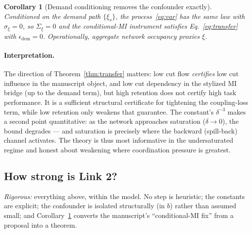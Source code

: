 \documentclass[11pt]{article}
\newtheorem{corollary}[theorem]{Corollary}
\theoremstyle{definition}
\theoremstyle{remark}
\begin{document}
\begin{corollary}[Demand conditioning removes the confounder exactly]
    \label{cor:demzero}
    Conditioned on the demand path $\{\xi_s\}$, the process~\eqref{eq:var} has
    the same law with $\sigma_\xi = 0$, so $\Sigma_\xi = 0$ and the
    conditional-MI instrument satisfies Eq.~\eqref{eq:transfer} with
    $\epsilon_{\mathrm{dem}} = 0$.
    Operationally, aggregate network occupancy proxies $\xi$.
\end{corollary}

\paragraph{Interpretation.}
The direction of Theorem~\ref{thm:transfer} matters: low cut flow
\emph{certifies} low cut influence in the manuscript object, and low cut
dependency in the stylized MI bridge (up to the demand term), but high
retention does not certify high task performance.
It is a sufficient structural certificate for tightening the coupling-loss
term, while low retention only weakens that guarantee.
The constant's $\delta^{-3}$ makes a second point quantitative: as the
network approaches saturation ($\delta \to 0$), the bound degrades --- and
saturation is precisely where the backward (spill-back) channel activates.
The theory is thus most informative in the undersaturated regime and honest
about weakening where coordination pressure is greatest.

\subsection{How strong is Link 2?}
\label{sec:link2strength}

\emph{Rigorous:} everything above, within the model.
No step is heuristic; the constants are explicit; the confounder is isolated
structurally (in $b$) rather than assumed small; and
Corollary~\ref{cor:demzero} converts the manuscript's ``conditional-MI fix''
from a proposal into a theorem.
\end{document}
